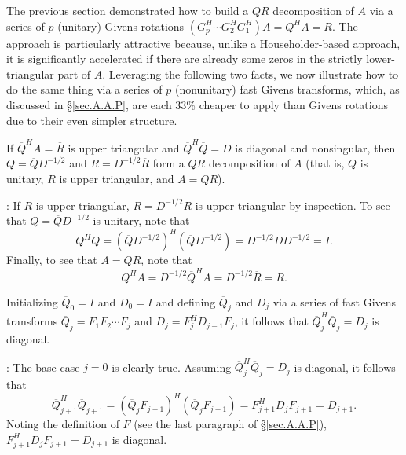 \noindent The previous section demonstrated how to build a $QR$ decomposition of $A$ via a series of $p$ (unitary) Givens rotations
$(G^H_p \cdots G^H_2 G^H_1)A=Q^H A = R$.  The approach is particularly attractive because, unlike a Householder-based approach, it is
significantly accelerated if there are already some zeros in the strictly lower-triangular part of $A$.
Leveraging the following two facts, we now illustrate how to do the same thing via a series of
$p$ (nonunitary) fast Givens transforms, which, as discussed in \S \ref{sec.A.A.P}, are each 33\%
cheaper to apply than Givens rotations due to their even simpler structure.

\begin{fact} \label{fact.A.D.B.Ea}
If $\overline Q^H A=\overline R$ is upper triangular and $\overline Q^H \overline Q=D$ is diagonal and nonsingular, then $Q=\overline Q D^{-1/2}$ and
$R=D^{-1/2} \overline R$ form a $QR$ decomposition of $A$ (that is, $Q$ is unitary, $R$ is upper triangular, and $A=QR$).
\end{fact}

\/: If $\overline R$ is upper triangular, $R=D^{-1/2} \overline R$ is upper triangular by inspection.
To see that $Q=\overline Q D^{-1/2}$ is unitary, note that
\begin{equation*}
  Q^H Q = (\overline Q D^{-1/2})^H (\overline Q D^{-1/2}) =  D^{-1/2} D D^{-1/2} = I.
\end{equation*}
Finally, to see that $A=QR$, note that
\begin{equation}
  Q^H A = D^{-1/2} \overline Q^H A = D^{-1/2} \overline R = R.  \tag*{$\Box$}
\end{equation}

\begin{fact} \label{fact.A.D.B.Eb}
Initializing $\overline Q_0=I$ and $D_0=I$ and defining $\overline Q_j$ and $D_j$ via a series of fast Givens transforms
$\overline Q_j=F_1 F_2 \cdots F_j$ and $D_j=F_j^H D_{j-1} F_j$, it follows that $\overline Q_j^H \overline Q_j = D_j$ is diagonal.
\end{fact}

\/: The base case $j=0$ is clearly true.  Assuming $\overline Q_j^H \overline Q_j=D_j$ is diagonal, it
follows that 
\begin{equation*}
 \overline Q_{j+1}^H \overline Q_{j+1} = (\overline Q_j F_{j+1})^H (\overline Q_j F_{j+1}) = F^H_{j+1} D_j  F_{j+1} = D_{j+1}.
\end{equation*}
Noting the definition of $F$ (see the last paragraph of \S \ref{sec.A.A.P}), $F^H_{j+1} D_j  F_{j+1} = D_{j+1}$ is diagonal. \endproof
\clearpage

